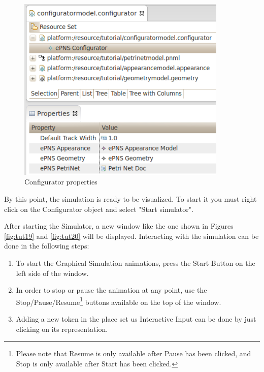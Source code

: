 \begin{figure}[htp]
\begin{center}
  \includegraphics[width=10.0cm]{image/tutorial/Tutorial_18.png}
  \caption{Configurator properties}
  \label{fig:tut18}
\end{center}
\end{figure}

\newpage
By this point, the simulation is ready to be visualized. To start it you must right click on the Configurator object and select 
"Start simulator". 

After starting the Simulator, a new window like the one shown in Figures \ref{fig:tut19} and \ref{fig:tut20} will be displayed. 
Interacting with the simulation can be done in the following steps:
 
\begin{enumerate}
  \item To start the Graphical Simulation animations, press the Start Button on the left side of the window. 
  \item In order to stop or pause the animation at any point, use the Stop/Pause/Resume\footnote{Please note that Resume is only available 
  after Pause has been clicked, and Stop is only available after Start has been clicked.} buttons available on the top of the window.
  \item Adding a new token in the place set us Interactive Input can be done by just clicking on its representation.
\end{enumerate}

